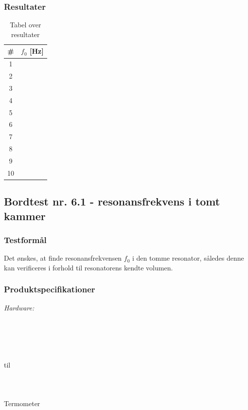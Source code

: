 	\subsubsection{Resultater}
	
	
			
		\begin{table}[]
\centering
\caption{Tabel over resultater}
\label{bordtest6resultater}
\begin{tabular}{c|l}
\textbf{\#}& \textbf{$f_{0}$ {[Hz]}} \\
\hline
1  &                  \\
2  &                  \\
3  &                  \\
4  &                  \\
5  &                  \\
6  &                  \\
7  &                  \\
8  &                  \\
9  &                  \\
10 &                 
\end{tabular}
\end{table}
			
	
	\subsection{Bordtest nr. 6.1 - resonansfrekvens i tomt kammer}
	
		\subsubsection{Testformål}
	Det ønskes, at finde resonansfrekvensen $f_{0}$ i den tomme resonator, således denne kan verificeres i forhold til resonatorens kendte volumen.  	
	
	\subsubsection{Produktspecifikationer}
	\textit{Hardware:}\\
	\\
	\elektretto\\
	\daq\\
	\\	
	\snot\\	
	 til \\
	\modellervoks\\
	\plade\\
	\PC\\
	Termometer\\
	
